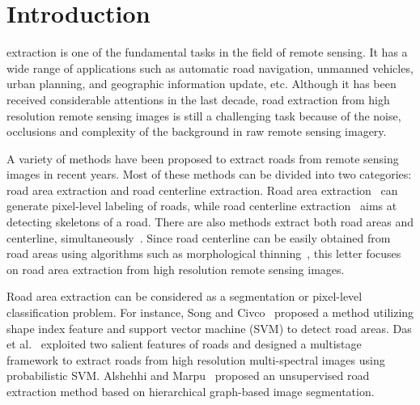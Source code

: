 \documentclass[journal]{IEEEtran}
\begin{document}
%



\section{Introduction}
 extraction is one of the fundamental tasks in the field of remote sensing. It has a wide range of applications such as automatic road navigation, unmanned vehicles, urban planning, and geographic information update, etc. Although it has been received considerable attentions in the last decade, road extraction from high resolution remote sensing images is still a challenging task because of the noise, occlusions and complexity of the background in raw remote sensing imagery.

A variety of methods have been proposed to extract roads from remote sensing images in recent years. Most of these methods can be divided into two categories: road area extraction and road centerline extraction. Road area  extraction~\cite{Xin2009Road,mnih2010learning,Unsalan2012Road,Cheng2015Urban,Saito2016Multiple,Alshehhi2017Hierarchical} can generate pixel-level labeling of roads, while road centerline extraction~\cite{Liu2015Main,Sujatha2015Connected} aims at detecting skeletons of a road. There are also methods extract both road areas and centerline, simultaneously~\cite{Cheng2017Automatic}. Since road centerline can be easily obtained from road areas using algorithms such as morphological thinning~\cite{Cheng2016Road}, this letter focuses on road area extraction from high resolution remote sensing images.

Road area extraction can be considered as a segmentation or pixel-level classification problem. For instance, Song and Civco~\cite{Song2004Road} proposed a method utilizing shape index feature and support vector machine (SVM) to detect road areas. Das et al.~\cite{Das2011Use} exploited two salient features of roads and designed a multistage framework to extract roads from high resolution multi-spectral images using probabilistic SVM. Alshehhi and Marpu~\cite{Alshehhi2017Hierarchical} proposed an unsupervised road extraction method based on hierarchical graph-based image segmentation.
\end{document}
